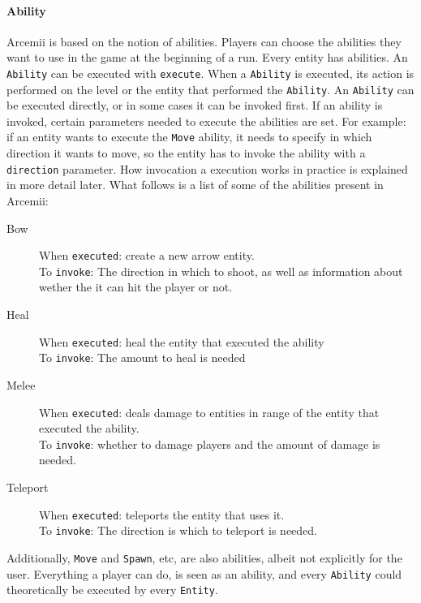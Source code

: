 \documentclass[../main.tex]{subfiles}
\begin{document}
        \paragraph{Ability}
        Arcemii is based on the notion of abilities. Players can choose the abilities they want to use in the game at the beginning of a run. Every entity has abilities. An \texttt{Ability} can be executed with \texttt{execute}. When a \texttt{Ability} is executed, its action is performed on the level or the entity that performed the \texttt{Ability}. An \texttt{Ability} can be executed directly, or in some cases it can be invoked first. If an ability is invoked, certain parameters needed to execute the abilities are set. For example: if an entity wants to execute the \texttt{Move} ability, it needs to specify in which direction it wants to move, so the entity has to invoke the ability with a \texttt{direction} parameter. How invocation a execution works in practice is explained in more detail later. What follows is a list of some of the abilities present in Arcemii:
        \begin{description}
            \item[Bow] When \texttt{executed}: create a new arrow entity. \\
            To \texttt{invoke}: The direction in which to shoot, as well as information about wether the it can hit the player or not.
            \item[Heal] When \texttt{executed}: heal the entity that executed the ability \\
            To \texttt{invoke}: The amount to heal is needed
            \item[Melee] When \texttt{executed}: deals damage to entities in range of the entity that executed the ability.\\
            To \texttt{invoke}: whether to damage players and the amount of damage is needed.
            \item[Teleport] When \texttt{executed}: teleports the entity that uses it.\\
            To \texttt{invoke}: The direction is which to teleport is needed.
        \end{description}
		Additionally, \texttt{Move} and \texttt{Spawn}, etc, are also abilities, albeit not explicitly for the user. Everything a player can do, is seen as an ability, and every \texttt{Ability} could theoretically be executed by every \texttt{Entity}. 
		
\end{document}
